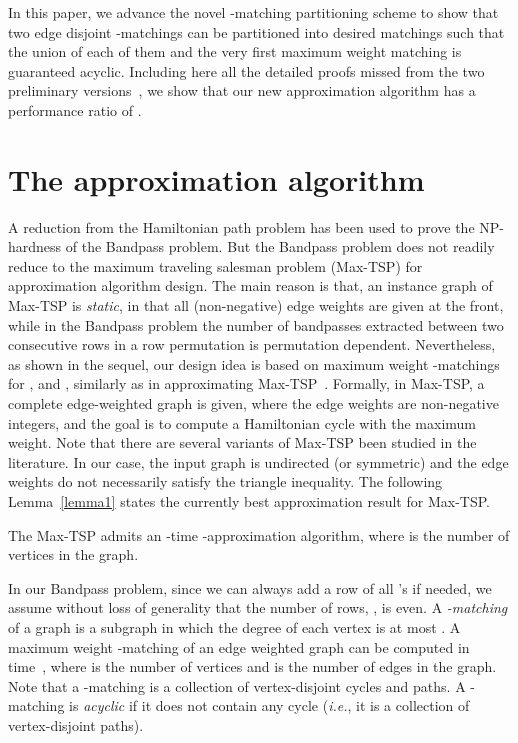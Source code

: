 \documentclass[11pt,twoside]{article}\usepackage{amssymb,latexsym,graphicx,hyperref}\usepackage{epstopdf}
\begin{document}
In this paper, we advance the novel -matching partitioning scheme to show that two edge disjoint -matchings
can be partitioned into  desired matchings such that the union of each of them and the very first maximum weight matching is guaranteed acyclic.
Including here all the detailed proofs missed from the two preliminary versions~\cite{TGD12,CW12},
we show that our new approximation algorithm has a performance ratio of .


\section{The approximation algorithm}
A reduction from the Hamiltonian path problem has been used to prove the NP-hardness of the Bandpass problem.
But the Bandpass problem does not readily reduce to the maximum traveling salesman problem (Max-TSP) \cite{GJ79} for approximation algorithm design.
The main reason is that, an instance graph of Max-TSP is {\em static}, in that all (non-negative) edge weights are given at the front,
while in the Bandpass problem the number of bandpasses extracted between two consecutive rows in a row permutation is permutation dependent.
Nevertheless, as shown in the sequel, our design idea is based on maximum weight -matchings for , and ,
similarly as in approximating Max-TSP~\cite{Ser84,HR00,COW05,PMM09}.
Formally, in Max-TSP, a complete edge-weighted graph is given, where the edge weights are non-negative integers,
and the goal is to compute a Hamiltonian cycle with the maximum weight.
Note that there are several variants of Max-TSP been studied in the literature.
In our case, the input graph is undirected (or symmetric) and the edge weights do not necessarily satisfy the triangle inequality.
The following Lemma~\ref{lemma1} states the currently best approximation result for Max-TSP.


\begin{lemma}
\label{lemma1}{\rm \cite{PMM09}}
The Max-TSP admits an -time -approximation algorithm, where  is the number of vertices in the graph.
\end{lemma}


In our Bandpass problem, since we can always add a row of all 's if needed,
we assume without loss of generality that the number of rows, , is even.
A {\em -matching} of a graph is a subgraph in which the degree of each vertex is at most .
A maximum weight -matching of an edge weighted graph can be computed in  time~\cite{Gab83,Ans87,MP95},
where  is the number of vertices and  is the number of edges in the graph.
Note that a -matching is a collection of vertex-disjoint cycles and paths.
A -matching is {\em acyclic} if it does not contain any cycle ({\it i.e.}, it is a collection of vertex-disjoint paths).
\end{document}
